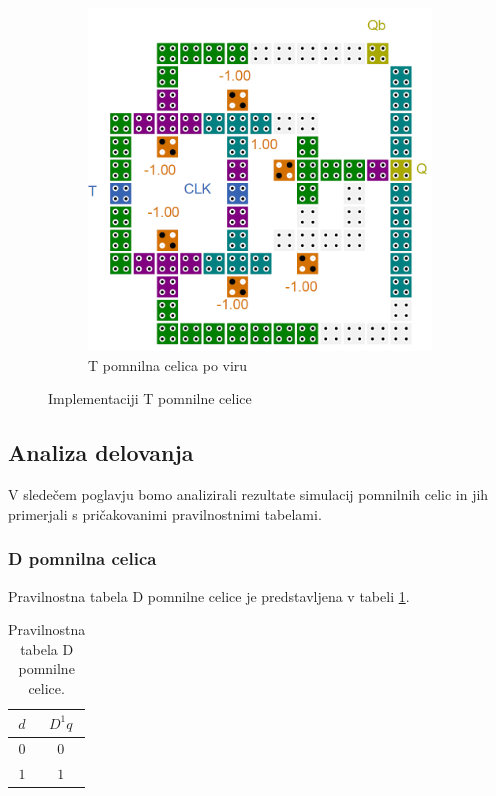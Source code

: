 \documentclass[a4paper, 11pt]{article}
\begin{document}
\begin{figure}[h!]
\begin{subfigure}[b]{0.5\textwidth}
	\includegraphics[width=\textwidth]{../img/vir_5/t.png} 
	\caption{T pomnilna celica po viru \cite{a_novel_approach}}
	\label{fig-t-2}
	\end{subfigure}
	\caption{Implementaciji T pomnilne celice}
	\label{fig-t}
\end{figure}


\subsection{Analiza delovanja}
V sledečem poglavju bomo analizirali rezultate simulacij pomnilnih celic in jih primerjali s pričakovanimi pravilnostnimi tabelami.

\subsubsection{D pomnilna celica}
Pravilnostna tabela D pomnilne celice je predstavljena v tabeli \ref{tab-d}.
\begin{table}[h!]
	\centering
	\small
	\begin{tabular}{c|c}
	$d$ & $D^1q$ \\
	\hline
	$0$ & $0$ \\
	$1$ & $1$ \\
	\end{tabular}
	\caption{Pravilnostna tabela D pomnilne celice.}
	\label{tab-d}
\end{table}
\end{document}
